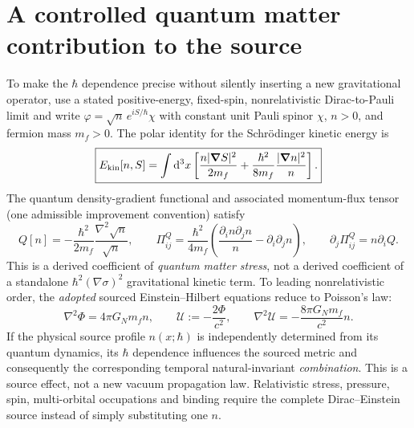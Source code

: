\documentclass[11pt,a4paper]{article}
\newcommand{\dd}{\mathrm d}
\begin{document}
\section{A controlled quantum matter contribution to the source}\label{sec:quantumsource}
To make the $\hbar$ dependence precise without silently inserting a
new gravitational operator, use a stated positive-energy,
fixed-spin, nonrelativistic Dirac-to-Pauli limit and write
$\varphi=\sqrt n\,e^{iS/\hbar}\chi$ with constant unit Pauli
spinor $\chi$, $n>0$, and fermion mass $m_f>0$.
The polar identity for the Schr\"odinger kinetic energy is
\begin{equation}\label{eq:quantumenergy}
\boxed{\displaystyle E_{\rm kin}[n,S]
=\int\dd^3x\left[
\frac{n|\bm\nabla S|^2}{2m_f}
+\frac{\hbar^2}{8m_f}\frac{|\bm\nabla n|^2}{n}\right].}
\end{equation}
The quantum density-gradient functional and associated momentum-flux
tensor (one admissible improvement convention) satisfy
\begin{equation}\label{eq:qstress}
\boxed{\displaystyle Q[n]=-\frac{\hbar^2}{2m_f}
\frac{\nabla^2\sqrt n}{\sqrt n},\qquad
\Pi^Q_{ij}=\frac{\hbar^2}{4m_f}
\left(\frac{\partial_i n\partial_j n}{n}-\partial_i\partial_j n\right),\qquad
\partial_j\Pi_{ij}^Q=n\partial_i Q.}
\end{equation}
This is a derived coefficient of \emph{quantum matter stress},
not a derived coefficient of a standalone
$\hbar^2(\nabla\sigma)^2$ gravitational kinetic term.
To leading nonrelativistic order, the \emph{adopted} sourced
Einstein--Hilbert equations reduce to Poisson's law:
\begin{equation}\label{eq:Uquantum}
\boxed{\displaystyle
\nabla^2\Phi=4\pi G_Nm_fn,\qquad
\mathcal U:=-\frac{2\Phi}{c^2},\qquad
\nabla^2\mathcal U=-\frac{8\pi G_Nm_f}{c^2}n.}
\end{equation}
If the physical source profile $n(x;\hbar)$ is independently determined
from its quantum dynamics, its $\hbar$ dependence influences the
sourced metric and consequently the corresponding temporal
natural-invariant \emph{combination}. This is a source effect, not a
new vacuum propagation law. Relativistic stress, pressure, spin,
multi-orbital occupations and binding require the complete
Dirac--Einstein source instead of simply substituting one $n$.
\end{document}
